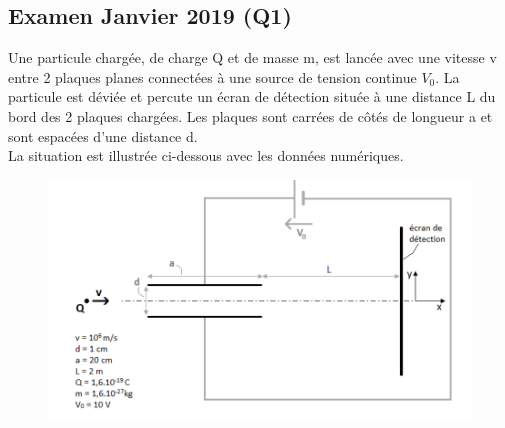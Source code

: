 \subsection{Examen Janvier 2019 (Q1)}

Une particule chargée, de charge Q et de masse m, est lancée avec une vitesse v entre 2 plaques planes connectées à une source de tension continue $V_0$. La particule est déviée et percute un écran de détection située à une distance L du bord des 2 plaques chargées.
Les plaques sont carrées de côtés de longueur a et sont espacées d’une distance d. \\
La situation est illustrée ci-dessous avec les données numériques.
\begin{figure}[h!]
    \centering
    \includegraphics[width = 17cm]{TpQEx_Champs/Q1_TheoChampsJanv2019.PNG}
    \label{fig:Q1_TheoChampsJanv2019}
\end{figure}

{%
}
\newpage
